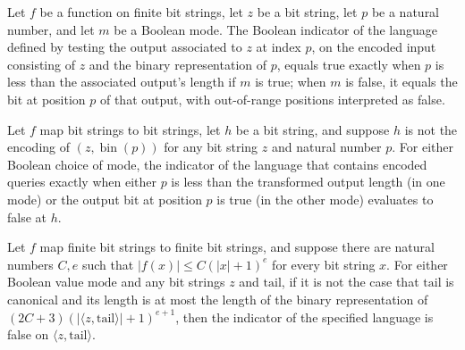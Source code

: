 \begin{lemma}
\label{Complexity.comp_lang_pair}
\leanok
{}
Let $f$ be a function on finite bit strings, let $z$ be a bit string, let $p$ be a
natural number, and let $m$ be a Boolean mode. The Boolean indicator of the language
defined by testing the output associated to $z$ at index $p$, on the encoded input
consisting of $z$ and the binary representation of $p$, equals true exactly when $p$ is
less than the associated output's length if $m$ is true; when $m$ is false, it equals
the bit at position $p$ of that output, with out-of-range positions interpreted as
false.
\end{lemma}

\begin{lemma}
\label{Complexity.comp_bad_query}
\leanok
{}
Let $f$ map bit strings to bit strings, let $h$ be a bit string, and suppose $h$ is not
the encoding of $(z,\operatorname{bin}(p))$ for any bit string $z$ and natural number
$p$. For either Boolean choice of mode, the indicator of the language that contains
encoded queries exactly when either $p$ is less than the transformed output length (in
one mode) or the output bit at position $p$ is true (in the other mode) evaluates to
false at $h$.
\end{lemma}

\begin{lemma}
\label{Complexity.comp_rejected_tail}
\leanok
{}
Let $f$ map finite bit strings to finite bit strings, and suppose there are natural
numbers $C,e$ such that $|f(x)|\le C(|x|+1)^e$ for every bit string $x$. For either
Boolean value $\mathrm{mode}$ and any bit strings $z$ and $\mathrm{tail}$, if it is not
the case that $\mathrm{tail}$ is canonical and its length is at most the length of the
binary representation of $(2C+3)(|\langle z,\mathrm{tail}\rangle|+1)^{e+1}$, then the
indicator of the specified language is false on $\langle z,\mathrm{tail}\rangle$.
\end{lemma}

